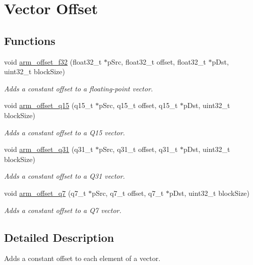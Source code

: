 \hypertarget{group__offset}{\section{Vector Offset}
\label{group__offset}
}
\subsection*{Functions}
\begin{DoxyCompactItemize}
\item 
void \hyperlink{group__offset_ga989dfae15235799d82f62ef9d356abb4}{arm\-\_\-offset\-\_\-f32} (float32\-\_\-t $\ast$p\-Src, float32\-\_\-t offset, float32\-\_\-t $\ast$p\-Dst, uint32\-\_\-t block\-Size)
\begin{DoxyCompactList}\small\item\em Adds a constant offset to a floating-\/point vector. \end{DoxyCompactList}\item 
void \hyperlink{group__offset_gab4c1d2391b599549e5a06fdfbc2747bf}{arm\-\_\-offset\-\_\-q15} (q15\-\_\-t $\ast$p\-Src, q15\-\_\-t offset, q15\-\_\-t $\ast$p\-Dst, uint32\-\_\-t block\-Size)
\begin{DoxyCompactList}\small\item\em Adds a constant offset to a Q15 vector. \end{DoxyCompactList}\item 
void \hyperlink{group__offset_gac84ec42cbbebc5c197a87d0221819acf}{arm\-\_\-offset\-\_\-q31} (q31\-\_\-t $\ast$p\-Src, q31\-\_\-t offset, q31\-\_\-t $\ast$p\-Dst, uint32\-\_\-t block\-Size)
\begin{DoxyCompactList}\small\item\em Adds a constant offset to a Q31 vector. \end{DoxyCompactList}\item 
void \hyperlink{group__offset_ga00bd9cc17c5bf905e76c91ad50886393}{arm\-\_\-offset\-\_\-q7} (q7\-\_\-t $\ast$p\-Src, q7\-\_\-t offset, q7\-\_\-t $\ast$p\-Dst, uint32\-\_\-t block\-Size)
\begin{DoxyCompactList}\small\item\em Adds a constant offset to a Q7 vector. \end{DoxyCompactList}\end{DoxyCompactItemize}


\subsection{Detailed Description}
Adds a constant offset to each element of a vector.


